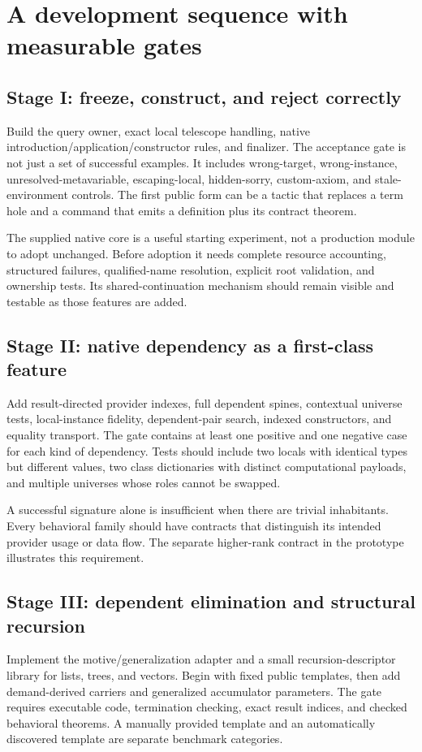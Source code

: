 \section{A development sequence with measurable gates}
\label{sec:roadmap}
\subsection{Stage I: freeze, construct, and reject correctly}
Build the query owner, exact local telescope handling, native introduction/application/constructor rules, and finalizer. The acceptance gate is not just a set of successful examples. It includes wrong-target, wrong-instance, unresolved-metavariable, escaping-local, hidden-sorry, custom-axiom, and stale-environment controls. The first public form can be a tactic that replaces a term hole and a command that emits a definition plus its contract theorem.

The supplied native core is a useful starting experiment, not a production module to adopt unchanged. Before adoption it needs complete resource accounting, structured failures, qualified-name resolution, explicit root validation, and ownership tests. Its shared-continuation mechanism should remain visible and testable as those features are added.

\subsection{Stage II: native dependency as a first-class feature}
Add result-directed provider indexes, full dependent spines, contextual universe tests, local-instance fidelity, dependent-pair search, indexed constructors, and equality transport. The gate contains at least one positive and one negative case for each kind of dependency. Tests should include two locals with identical types but different values, two class dictionaries with distinct computational payloads, and multiple universes whose roles cannot be swapped.

A successful signature alone is insufficient when there are trivial inhabitants. Every behavioral family should have contracts that distinguish its intended provider usage or data flow. The separate higher-rank contract in the prototype illustrates this requirement.

\subsection{Stage III: dependent elimination and structural recursion}
Implement the motive/generalization adapter and a small recursion-descriptor library for lists, trees, and vectors. Begin with fixed public templates, then add demand-derived carriers and generalized accumulator parameters. The gate requires executable code, termination checking, exact result indices, and checked behavioral theorems. A manually provided template and an automatically discovered template are separate benchmark categories.

